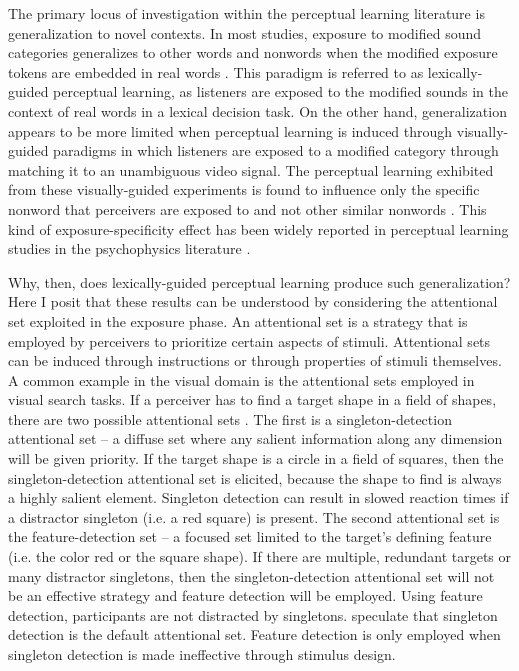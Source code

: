 The primary locus of investigation within the perceptual learning literature is generalization to novel contexts.
In most studies, exposure to modified sound categories generalizes to other words and nonwords when the modified exposure tokens are embedded in real words \citep{Norris2003, Reinisch2013}.  
This paradigm is referred to as lexically-guided perceptual learning, as listeners are exposed to the modified sounds in the context of real words in a lexical decision task.
On the other hand, generalization appears to be more limited when perceptual learning is induced through visually-guided paradigms in which listeners are exposed to a modified category through matching it to an unambiguous video signal.  
The perceptual learning exhibited from these visually-guided experiments is found to influence only the specific nonword that perceivers are exposed to and not other similar nonwords \citep{Reinisch2014}.  
This kind of exposure-specificity effect has been widely reported in perceptual learning studies in the psychophysics literature \citep[for review]{Gibson1953}.

Why, then, does lexically-guided perceptual learning produce such generalization?
Here I posit that these results can be understood by considering the attentional set exploited in the exposure phase.
An attentional set is a strategy that is employed by perceivers to prioritize certain aspects of stimuli.
Attentional sets can be induced through instructions or through properties of stimuli themselves.
A common example in the visual domain is the attentional sets employed in visual search tasks.
If a perceiver has to find a target shape in a field of shapes, there are two possible attentional sets \citep{Bacon1994}.
The first is a singleton-detection attentional set --  a diffuse set where any salient information along any dimension will be given priority.
If the target shape is a circle in a field of squares, then the singleton-detection attentional set is elicited, because the shape to find is always a highly salient element.
Singleton detection can result in slowed reaction times if a distractor singleton (i.e. a red square) is present.
The second attentional set is the feature-detection set -- a focused set limited to the target's defining feature (i.e. the color red or the square shape).
If there are multiple, redundant targets or many distractor singletons, then the singleton-detection attentional set will not be an effective strategy and feature detection will be employed.
Using feature detection, participants are not distracted by singletons.
\citet{Bacon1994} speculate that singleton detection is the default attentional set.
Feature detection is only employed when singleton detection is made ineffective through stimulus design.

